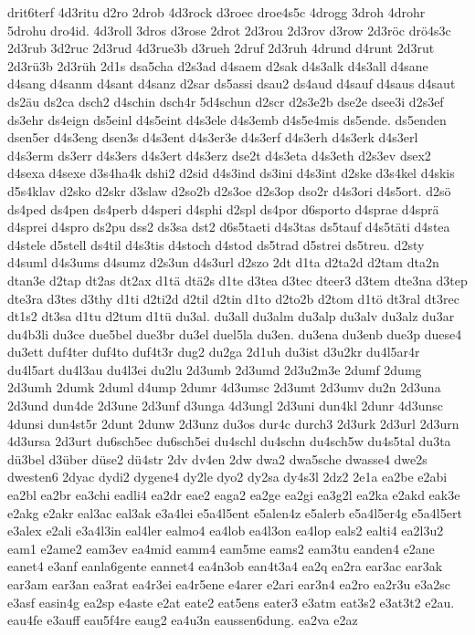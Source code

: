 {drit6terf
4d3ritu
d2ro
2drob
4d3rock
d3roec
droe4s5c
4drogg
3droh
4drohr
5drohu
dro4id.
4d3roll
3dros
d3rose
2drot
2d3rou
2d3rov
d3row
2d3röc
drö4s3c
2d3rub
3d2ruc
2d3rud
4d3rue3b
d3rueh
2druf
2d3ruh
4drund
d4runt
2d3rut
2d3rü3b
2d3rüh
2d1s
dsa5cha
d2s3ad
d4saem
d2sak
d4s3alk
d4s3all
d4sane
d4sang
d4sanm
d4sant
d4sanz
d2sar
ds5assi
dsau2
ds4aud
d4sauf
d4saus
d4saut
ds2äu
ds2ca
dsch2
d4schin
dsch4r
5d4schun
d2scr
d2s3e2b
dse2e
dsee3i
d2s3ef
ds3ehr
ds4eign
ds5einl
d4s5eint
d4s3ele
d4s3emb
d4s5e4mis
ds5ende.
ds5enden
dsen5er
d4s3eng
dsen3s
d4s3ent
d4s3er3e
d4s3erf
d4s3erh
d4s3erk
d4s3erl
d4s3erm
ds3err
d4s3ers
d4s3ert
d4s3erz
dse2t
d4s3eta
d4s3eth
d2s3ev
dsex2
d4sexa
d4sexe
d3s4ha4k
dshi2
d2sid
d4s3ind
ds3ini
d4s3int
d2ske
d3s4kel
d4skis
d5s4klav
d2sko
d2skr
d3slaw
d2so2b
d2s3oe
d2s3op
dso2r
d4s3ori
d4s5ort.
d2sö
ds4ped
ds4pen
ds4perb
d4speri
d4sphi
d2spl
ds4por
d6sporto
d4sprae
d4sprä
d4sprei
d4spro
ds2pu
dss2
ds3sa
dst2
d6s5taeti
d4s3tas
ds5tauf
d4s5täti
d4stea
d4stele
d5stell
ds4til
d4s3tis
d4stoch
d4stod
ds5trad
d5strei
ds5treu.
d2sty
d4suml
d4s3ums
d4sumz
d2s3un
d4s3url
d2szo
2dt
d1ta
d2ta2d
d2tam
dta2n
dtan3e
d2tap
dt2as
dt2ax
d1tä
dtä2s
d1te
d3tea
d3tec
dteer3
d3tem
dte3na
d3tep
dte3ra
d3tes
d3thy
d1ti
d2ti2d
d2til
d2tin
d1to
d2to2b
d2tom
d1tö
dt3ral
dt3rec
dt1s2
dt3sa
d1tu
d2tum
d1tü
du3al.
du3all
du3alm
du3alp
du3alv
du3alz
du3ar
du4b3li
du3ce
due5bel
due3br
du3el
duel5la
du3en.
du3ena
du3enb
due3p
duese4
du3ett
duf4ter
duf4to
duf4t3r
dug2
du2ga
2d1uh
du3ist
d3u2kr
du4l5ar4r
du4l5art
du4l3au
du4l3ei
du2lu
2d3umb
2d3umd
2d3u2m3e
2dumf
2dumg
2d3umh
2dumk
2duml
d4ump
2dumr
4d3umsc
2d3umt
2d3umv
du2n
2d3una
2d3und
dun4de
2d3une
2d3unf
d3unga
4d3ungl
2d3uni
dun4kl
2dunr
4d3unsc
4dunsi
dun4st5r
2dunt
2dunw
2d3unz
du3os
dur4c
durch3
2d3urk
2d3url
2d3urn
4d3ursa
2d3urt
du6sch5ec
du6sch5ei
du4schl
du4schn
du4sch5w
du4s5tal
du3ta
dü3bel
d3über
düse2
dü4str
2dv
dv4en
2dw
dwa2
dwa5sche
dwasse4
dwe2s
dwesten6
2dyac
dydi2
dygene4
dy2le
dyo2
dy2sa
dy4s3l
2dz2
2e1a
ea2be
e2abi
ea2bl
ea2br
ea3chi
eadli4
ea2dr
eae2
eaga2
ea2ge
ea2gi
ea3g2l
ea2ka
e2akd
eak3e
e2akg
e2akr
eal3ac
eal3ak
e3a4lei
e5a4l5ent
e5alen4z
e5alerb
e5a4l5er4g
e5a4l5ert
e3alex
e2ali
e3a4l3in
eal4ler
ealmo4
ea4lob
ea4l3on
ea4lop
eals2
ealti4
ea2l3u2
eam1
e2ame2
eam3ev
ea4mid
eamm4
eam5me
eams2
eam3tu
eanden4
e2ane
eanet4
e3anf
eanla6gente
eannet4
ea4n3ob
ean4t3a4
ea2q
ea2ra
ear3ac
ear3ak
ear3am
ear3an
ea3rat
ea4r3ei
ea4r5ene
e4arer
e2ari
ear3n4
ea2ro
ea2r3u
e3a2sc
e3asf
easin4g
ea2sp
e4aste
e2at
eate2
eat5ens
eater3
e3atm
eat3s2
e3at3t2
e2au.
eau4fe
e3auff
eau5f4re
eaug2
ea4u3n
eaussen6dung.
ea2va
e2az
}
